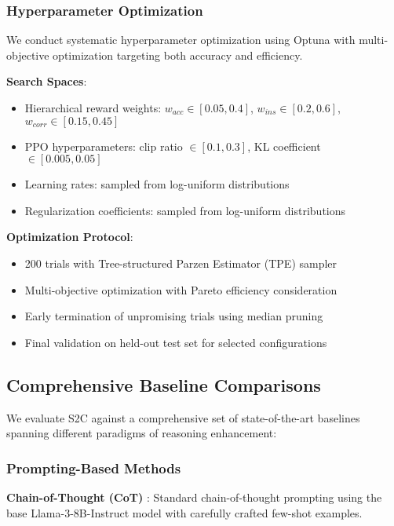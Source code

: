 \documentclass[10pt,twocolumn]{article}
\newcommand{\ssc}{\textsc{S2C}}
\begin{document}
\subsubsection{Hyperparameter Optimization}

We conduct systematic hyperparameter optimization using Optuna \cite{akiba2019optuna} with multi-objective optimization targeting both accuracy and efficiency.

\textbf{Search Spaces}:
\begin{itemize}[leftmargin=*]
\item Hierarchical reward weights: $w_{acc} \in [0.05, 0.4]$, $w_{ins} \in [0.2, 0.6]$, $w_{corr} \in [0.15, 0.45]$
\item PPO hyperparameters: clip ratio $\in [0.1, 0.3]$, KL coefficient $\in [0.005, 0.05]$
\item Learning rates: sampled from log-uniform distributions
\item Regularization coefficients: sampled from log-uniform distributions
\end{itemize}

\textbf{Optimization Protocol}:
\begin{itemize}[leftmargin=*]
\item 200 trials with Tree-structured Parzen Estimator (TPE) sampler
\item Multi-objective optimization with Pareto efficiency consideration
\item Early termination of unpromising trials using median pruning
\item Final validation on held-out test set for selected configurations
\end{itemize}

\subsection{Comprehensive Baseline Comparisons}

We evaluate \ssc{} against a comprehensive set of state-of-the-art baselines spanning different paradigms of reasoning enhancement:

\subsubsection{Prompting-Based Methods}

\textbf{Chain-of-Thought (CoT)} \cite{wei2022chain}: Standard chain-of-thought prompting using the base Llama-3-8B-Instruct model with carefully crafted few-shot examples.
\end{document}
